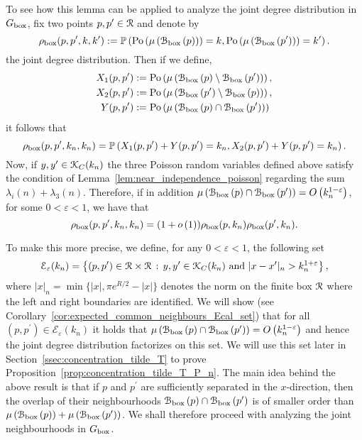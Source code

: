 To see how this lemma can be applied to analyze the joint degree distribution in $G_{\mathrm{box}}$, fix two points $p,p^\prime \in {\mathcal R}$ and denote by 
\begin{equation}\label{eq:def_joint_degree_distribution}
	\rho_{\text{box}}(p,p^\prime,k,k^\prime) 
	:= \mathbb{P}\left({\mathrm{Po}}\left(\mu\left({\mathcal B}_{\text{box}}\left(p\right)\right)\right) = k, {\mathrm{Po}}\left(\mu\left({\mathcal B}_{\text{box}}\left(p^\prime\right)\right)\right) = k^\prime\right).
\end{equation}
the joint degree distribution. Then if we define,
\begin{align*}
	X_1(p,p^\prime) &:= {\mathrm{Po}}\left(\mu\left({\mathcal B}_{\text{box}}\left(p\right)\setminus {\mathcal B}_{\text{box}}\left(p^\prime\right)\right)\right),\\
	X_2(p,p^\prime) &:= {\mathrm{Po}}\left(\mu\left({\mathcal B}_{\text{box}}\left(p^\prime\right)\setminus {\mathcal B}_{\text{box}}\left(p\right)\right)\right),\\
	Y(p,p^\prime) &:= {\mathrm{Po}}\left(\mu\left({\mathcal B}_{\text{box}}\left(p\right) \cap {\mathcal B}_{\text{box}}\left(p^\prime\right)\right)\right)
\end{align*}
it follows that
\[
	\rho_{\text{box}}(p,p^\prime,k_n,k_n) = \mathbb{P}\left(X_1(p,p^\prime) + Y(p,p^\prime) = k_n, X_2(p,p^\prime) + Y(p,p^\prime) = k_n\right).
\]
Now, if $y,y^\prime \in {\mathcal K}_{C}(k_n)$ the three Poisson random variables defined above satisfy the condition of Lemma~\ref{lem:near_independence_poisson} regarding the sum $\lambda_i(n) + \lambda_3(n)$. Therefore, if in addition $\mu\left({\mathcal B}_{\text{box}}\left(p\right) \cap {\mathcal B}_{\text{box}}\left(p^\prime\right)\right) = O\left(k_n^{1-\varepsilon}\right)$, for some $0 < \varepsilon < 1$, we have that 
\[
	\rho_{\text{box}}(p,p^\prime,k_n,k_n) = (1+o\left(1\right))\rho_{\text{box}}(p,k_n)\rho_{\text{box}}(p^\prime,k_n). 
\]

To make this more precise, we define, for any $0 < \varepsilon < 1$, the following set
\begin{equation}\label{eq:def_joint_degree_set_E_growing_k}
	\mathcal{E}_{\varepsilon}(k_n) = \left\{(p,p^\prime) \in {\mathcal R} \times {\mathcal R}
		\, : \, y,y^\prime \in {\mathcal K}_{C}(k_n) \text{ and } |x - x^\prime|_n > k_n^{1 + \varepsilon} \right\}, 
\end{equation}
where $|x|_n = \min\{|x|, \pi e^{R/2} - |x|\}$ denotes the norm on the finite box ${\mathcal R}$ where the left and right boundaries are identified. We will show (see Corollary~\ref{cor:expected_common_neighbours_Ecal_set}) that for all $(p,p^\prime) \in \mathcal{E}_\varepsilon(k_n)$ it holds that $\mu\left({\mathcal B}_{\text{box}}\left(p\right) \cap {\mathcal B}_{\text{box}}\left(p^\prime\right)\right) = O\left(k_n^{1-\varepsilon}\right)$ and hence the joint degree distribution factorizes on this set. We will use this set later in Section~\ref{ssec:concentration_tilde_T} to prove Proposition~\ref{prop:concentration_tilde_T_P_n}. The main idea behind the above result is that if $p$ and $p^\prime$ are sufficiently separated in the $x$-direction, then the overlap of their neighbourhoods ${\mathcal B}_{\text{box}}\left(p\right) \cap {\mathcal B}_{\text{box}}\left(p^\prime\right)$ is of smaller order than $\mu\left({\mathcal B}_{\text{box}}\left(p\right)\right) + \mu\left({\mathcal B}_{\text{box}}\left(p^\prime\right)\right)$. We shall therefore proceed with analyzing the joint neighbourhoods in $G_{\mathrm{box}}$.
%
%
%

